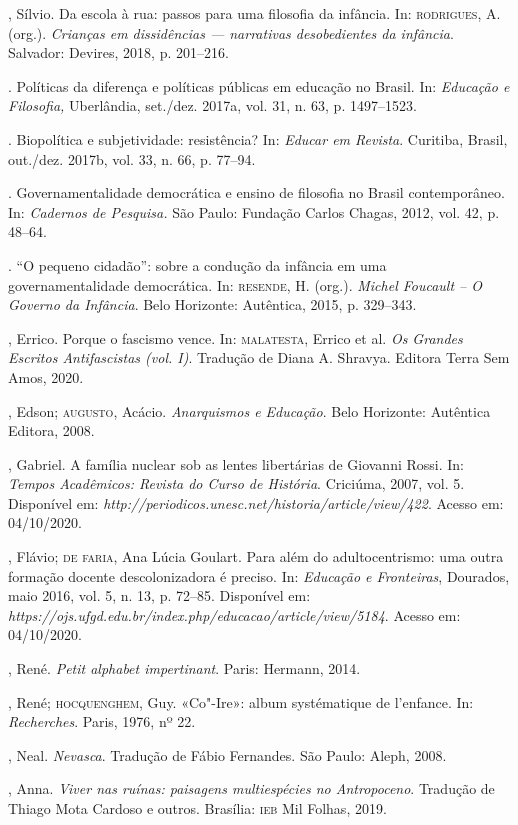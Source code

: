 \begin{bibliohedra}
, Sílvio. Da escola à rua: passos para uma filosofia da infância.
In: \textsc{rodrigues}, A. (org.). \emph{Crianças em dissidências --- narrativas
desobedientes da infância}. Salvador: Devires, 2018, p. 201--216.

\titidem. Políticas da diferença e políticas públicas em educação no
Brasil. In: \emph{Educação e Filosofia,} Uberlândia, set./dez. 2017a,
vol. 31, n. 63, p. 1497--1523.

\titidem. Biopolítica e subjetividade: resistência? In: \emph{Educar em
Revista}. Curitiba, Brasil, out./dez. 2017b, vol. 33, n. 66, p. 77--94.

\titidem. Governamentalidade democrática e ensino de filosofia no Brasil
contemporâneo. In: \emph{Cadernos de Pesquisa.} São Paulo: Fundação
Carlos Chagas, 2012, vol. 42, p. 48--64.

\titidem. ``O pequeno cidadão'': sobre a condução da infância em uma
governamentalidade democrática. In: \textsc{resende}, H. (org.). \emph{Michel
Foucault -- O Governo da Infância}. Belo Horizonte: Autêntica, 2015, p.
329--343.

, Errico. Porque o fascismo vence. In: \textsc{malatesta}, Errico et al.
\emph{Os Grandes Escritos Antifascistas (vol. I)}. Tradução de Diana A.
Shravya. Editora Terra Sem Amos, 2020.

, Edson; \textsc{augusto}, Acácio.
\emph{Anarquismos e Educação}. Belo Horizonte: Autêntica Editora, 2008.

, Gabriel. A família nuclear sob as lentes libertárias de
Giovanni Rossi. In: \emph{Tempos Acadêmicos: Revista do Curso de
História}. Criciúma, 2007, vol. 5. Disponível em:
\emph{http://periodicos.unesc.net/historia/article/view/422}. Acesso em:
04/10/2020.

, Flávio; \textsc{de faria}, Ana Lúcia Goulart. Para além do
adultocentrismo: uma outra formação docente descolonizadora é preciso.
In: \emph{Educação e Fronteiras}, Dourados, maio 2016, vol. 5, n. 13, p.
72--85. Disponível em:
\emph{https://ojs.ufgd.edu.br/index.php/educacao/article/view/5184}.
Acesso em: 04/10/2020.

, René. \emph{Petit alphabet impertinant}. Paris: Hermann, 2014.

, René; \textsc{hocquenghem}, Guy. «Co"-Ire»: album systématique de
l'enfance. In: \emph{Recherches}. Paris, 1976, nº 22.

, Neal. \emph{Nevasca}. Tradução de Fábio Fernandes. São
Paulo: Aleph, 2008.

, Anna. \emph{Viver nas ruínas: paisagens multiespécies no
Antropoceno}. Tradução de Thiago Mota Cardoso e outros. Brasília: \textsc{ieb}
Mil Folhas, 2019.
\end{bibliohedra}

